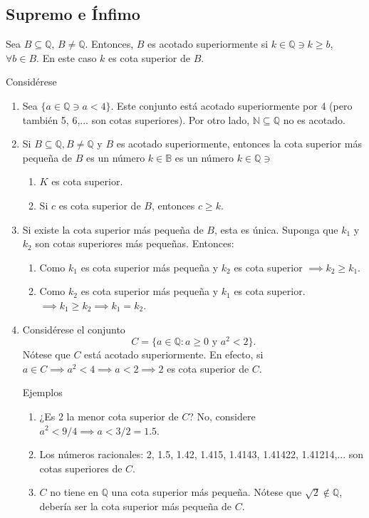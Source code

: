 \subsection{Supremo e Ínfimo}
\begin{nota}
	Sea $B\subseteq \mathbb{Q}$, $B\neq \mathbb{Q}$. Entonces, $B$ es acotado superiormente si $k\in\mathbb{Q}\ni k\geq b$, $\forall b\in B$. En este caso $k$ es cota superior de $B$. 
\end{nota}

\begin{ejemplo}
	Considérese
	\begin{enumerate}
		\item Sea $\{a\in\mathbb{Q}\ni a<4\}$. Este conjunto está acotado superiormente por 4 (pero también 5, 6,... son cotas superiores). Por otro lado, $\mathbb{N}\subseteq \mathbb{Q}$ no es acotado. 
		\item Si $B\subseteq \mathbb{Q}, B\neq \mathbb{Q}$ y $B$ es acotado superiormente, entonces la cota superior más pequeña de $B$ es un número $k\in\mathbb{B}$ es un número $k\in \mathbb{Q}\ni$ 
		\begin{enumerate}
			\item $K$ es cota superior. 
			\item Si $c$ es cota superior de $B$, entonces $c\geq k$. 
		\end{enumerate}
	\item Si existe la cota superior más pequeña de $B$, esta es única. Suponga que $k_1$ y $k_2$ son cotas superiores más pequeñas. Entonces: 
	\begin{enumerate}
		\item Como $k_1$ es cota superior más pequeña y $k_2$ es cota superior $\implies k_2\geq k_1$. 
		\item Como $k_2$ es cota superior más pequeña y $k_1$ es cota superior. $\implies k_1\geq k_2 \implies k_1=k_2$. 
	\end{enumerate}

\item Considérese el conjunto $$C=\{a\in\mathbb{Q}:a\geq 0 \text{ y } a^2<2\}.$$
Nótese que $C$ está acotado superiormente. En efecto, si $a\in C\implies a^2<4\implies a<2\implies 2$ es cota superior de $C$. 
\begin{ejemplo}
	Ejemplos 
	\begin{enumerate}
		\item ¿Es 2 la menor cota superior de $C$? No, considere $a^2<9/4\implies a<3/2=1.5$. 
		\item Los números racionales: 2, 1.5, 1.42, 1.415, 1.4143, 1.41422, 1.41214,... son cotas superiores de $C$. 
		\item $C$ no tiene en $\mathbb{Q}$ una cota superior más pequeña. Nótese que $\sqrt{2}\not\in \mathbb{Q}$, debería ser la cota superior más pequeña de $C$. 
	\end{enumerate}
\end{ejemplo}
	\end{enumerate}
\end{ejemplo}

